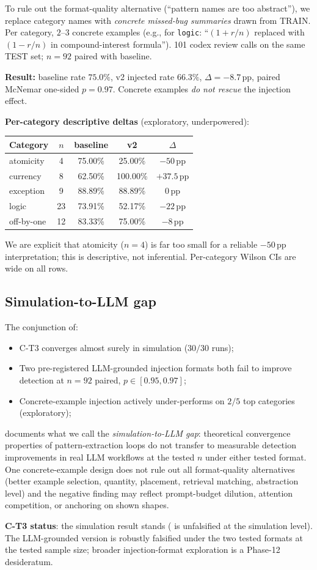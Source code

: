 To rule out the format-quality alternative (``pattern names are too abstract''), we replace category names with \emph{concrete missed-bug summaries} drawn from TRAIN. Per category, $2$--$3$ concrete examples (e.g., for \texttt{logic}: ``$(1 + r/n)$ replaced with $(1 - r/n)$ in compound-interest formula''). 101 codex review calls on the same TEST set; $n = 92$ paired with baseline.

\textbf{Result:} baseline rate $75.0\%$, v2 injected rate $66.3\%$, $\Delta = -8.7\,\mathrm{pp}$, paired McNemar one-sided $p = 0.97$. Concrete examples \emph{do not rescue} the injection effect.

\textbf{Per-category descriptive deltas} (exploratory, underpowered):
\begin{center}
\small
\begin{tabular}{@{}lcccc@{}}
\toprule
Category & $n$ & baseline & v2 & $\Delta$ \\
\midrule
atomicity & 4 & 75.00\% & 25.00\% & $-50\,\mathrm{pp}$ \\
currency & 8 & 62.50\% & 100.00\% & $+37.5\,\mathrm{pp}$ \\
exception & 9 & 88.89\% & 88.89\% & $0\,\mathrm{pp}$ \\
logic & 23 & 73.91\% & 52.17\% & $-22\,\mathrm{pp}$ \\
off-by-one & 12 & 83.33\% & 75.00\% & $-8\,\mathrm{pp}$ \\
\bottomrule
\end{tabular}
\end{center}

We are explicit that atomicity ($n=4$) is far too small for a reliable $-50\,\mathrm{pp}$ interpretation; this is descriptive, not inferential. Per-category Wilson CIs are wide on all rows.

\subsection{Simulation-to-LLM gap}

The conjunction of:
\begin{itemize}[leftmargin=2em]
\item C-T3 converges almost surely in simulation ($30/30$ runs);
\item Two pre-registered LLM-grounded injection formats both fail to improve detection at $n = 92$ paired, $p \in [0.95, 0.97]$;
\item Concrete-example injection actively under-performs on $2/5$ top categories (exploratory);
\end{itemize}
documents what we call the \emph{simulation-to-LLM gap}: theoretical convergence properties of pattern-extraction loops do not transfer to measurable detection improvements in real LLM workflows at the tested $n$ under either tested format. One concrete-example design does not rule out all format-quality alternatives (better example selection, quantity, placement, retrieval matching, abstraction level) and the negative finding may reflect prompt-budget dilution, attention competition, or anchoring on shown shapes.

\textbf{C-T3 status}: the simulation result stands ( is unfalsified at the simulation level). The LLM-grounded version is robustly falsified under the two tested formats at the tested sample size; broader injection-format exploration is a Phase-12 desideratum.
